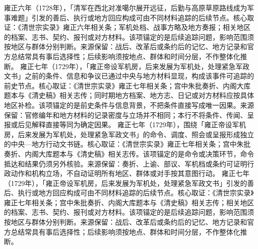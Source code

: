 雍正六年（1728年），「清军在西北对准噶尔展开远征，后勤与高原草原路线成为军事难题」引发的善后、执行或地方回应构成可由不同材料追踪的后续节点。核心取证：《清世宗实录》雍正六年相关条；军机处档、战事方略及地方奏报；相关地区的档案、志书、契约、报刊或对方材料。该项锚定的是后续追踪问题，影响范围须按地区与群体分别判断。来源保留：战后、改革后或条约后的记忆、地方记录和官方总结常具有事后选择性；后续影响须按地点、群体和时间分层，不作整体化推断。
雍正七年（1729年），「雍正帝设军机房，后来发展为军机处，处理紧急军政文书」之前的条件、信息和争议已通过中央与地方材料显现，构成该事件可追踪的前史节点。核心取证：《清世宗实录》雍正七年相关条；宫中朱批奏折、内阁大库题本与《清史稿》相关志传；同时期地方档案、地方志、日记或对方材料应按具体地区补检。该项锚定的是前史条件与信息背景，不把条件直接写成唯一因果。来源保留：官修编年和地方材料的记录密度与立场并不相同；本行不将条件、传闻、呈报或后见解释直接等同为确定因果。
雍正七年（1729年），围绕「雍正帝设军机房，后来发展为军机处，处理紧急军政文书」的命令、调度、照会或呈报形成独立的中央—地方行动文书链。核心取证：《清世宗实录》雍正七年相关条；宫中朱批奏折、内阁大库题本与《清史稿》相关志传。该项锚定的是命令或决策环节，命令抵达和结果仍须另外核验。来源保留：奏折、上谕、部议、军机档或条约可证明行政动作和机构立场，不自动证明所有地区、群体或对手按其意图行动。
雍正七年（1729年），「雍正帝设军机房，后来发展为军机处，处理紧急军政文书」引发的善后、执行或地方回应构成可由不同材料追踪的后续节点。核心取证：《清世宗实录》雍正七年相关条；宫中朱批奏折、内阁大库题本与《清史稿》相关志传；相关地区的档案、志书、契约、报刊或对方材料。该项锚定的是后续追踪问题，影响范围须按地区与群体分别判断。来源保留：战后、改革后或条约后的记忆、地方记录和官方总结常具有事后选择性；后续影响须按地点、群体和时间分层，不作整体化推断。

